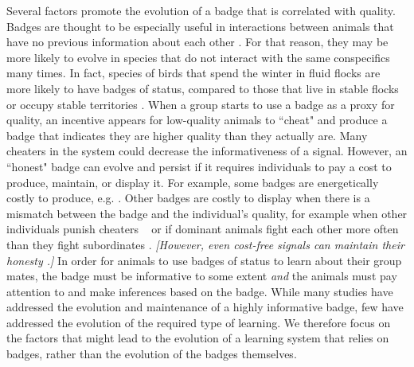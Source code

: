 Several factors promote the evolution of a badge that is correlated with quality. Badges are thought to be especially useful in interactions between animals that have no previous information about each other \cite{Remy:2010fk,Lemel:1993ve,Solberg:1997uq}. For that reason, they may be more likely to evolve in species that do not interact with the same conspecifics many times. In fact, species of birds that spend the winter in fluid flocks are more likely to have badges of status, compared to those that live in stable flocks or occupy stable territories \cite{Rohwer:1975fk,Tibbetts:2009kx}. When a group starts to use a badge as a proxy for quality, an incentive appears for low-quality animals to ``cheat" and produce a badge that indicates they are higher quality than they actually are. Many cheaters in the system could decrease the informativeness of a signal. However, an ``honest" badge can evolve and persist if it requires individuals to pay a cost to produce, maintain, or display it. For example, some badges are energetically costly to produce, e.g. \cite{Veiga:1995ys,Buchanan:2001zr,West:2002ly}. Other badges are costly to display when there is a mismatch between the badge and the individual's quality, for example when other individuals punish cheaters ~\cite{Smith2003AnimalSignals,Tibbetts:2004kx,Molles:2001kx} or if dominant animals fight each other more often than they fight subordinates \cite{Rohwer:1981vn}.  
\textit{[However, even cost-free signals can maintain their honesty \cite{Dawkins:1991ly,Lachmann:2001uq}.]} 
In order for animals to use badges of status to learn about their group mates, the badge must be informative to some extent \emph{and} the animals must pay attention to and make inferences based on the badge. While many studies have addressed the evolution and maintenance of a highly informative badge, few have addressed the evolution of the required type of learning.  We therefore focus on the factors that might lead to the evolution of a learning system that relies on badges, rather than the evolution of the badges themselves.


